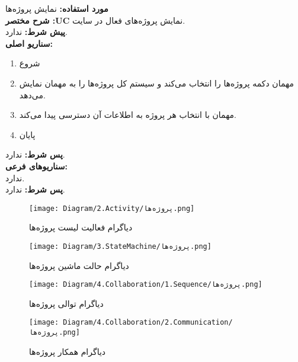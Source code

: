 
\textbf{مورد استفاده:}
نمایش پروژه‌ها
\\
\textbf{شرح مختصر :UC}
نمایش پروژه‌های فعال در سایت.
\\
\textbf{پيش شرط:}
ندارد.
\\
\textbf{سناريو اصلی:}
\begin{enumerate}
\item
شروع
\item
مهمان دکمه پروژه‌ها را انتخاب می‌کند و سیستم کل پروژه‌ها را به مهمان نمایش می‌دهد.
\item
مهمان با انتخاب هر پروژه‌ به اطلاعات آن دسترسی پیدا می‌کند.
\item
پایان
\end{enumerate}

\noindent
\textbf{پس شرط:}
ندارد.
\\
\textbf{سناريوهای فرعی:}
\\
ندارد.
\\
\textbf{پس شرط:}
ندارد.


\begin{figure}[H]
	\centering
	\texttt{[image: Diagram/2.Activity/پروژه‌ها.png]}
	\caption{دیاگرام فعالیت لیست پروژه‌ها}
	\label{fig:a:پروژه‌ها}
\end{figure}
\begin{figure}[H]
\centering
\texttt{[image: Diagram/3.StateMachine/پروژ‌ه‌ها.png]}
\caption{دیاگرام حالت ماشین پروژه‌ها}
\label{fig:sm:پروژه‌ها}
\end{figure}
\begin{figure}[H]
	\centering
	\texttt{[image: Diagram/4.Collaboration/1.Sequence/پروژه‌ها.png]}
	\caption{دیاگرام توالی پروژه‌ها}
	\label{fig:s:پروژه‌ها}
\end{figure}
\begin{figure}[H]
	\centering
	\texttt{[image: Diagram/4.Collaboration/2.Communication/پروژه‌ها.png]}
	\caption{دیاگرام همکار پروژه‌ها}
	\label{fig:c:پروژه‌ها}
\end{figure}
